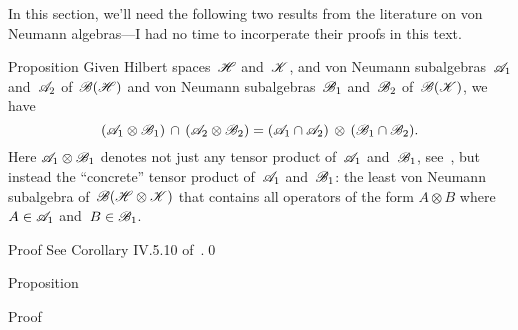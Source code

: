 \documentclass[a]{subfiles}
\begin{document}
\begin{parsec}%
\begin{point}%
In this section,
we'll need the following two results
from the literature on von Neumann algebras---I 
had no time to incorperate their proofs in this text.
\end{point}
\begin{point}{Proposition}%
Given Hilbert spaces~$\mathscr{H}$ and~$\mathscr{K}$,
and von Neumann subalgebras~$\mathscr{A}_1$ and~$\mathscr{A}_2$
of~$\mathscr{B}(\mathscr{H})$
and von Neumann subalgebras~$\mathscr{B}_1$ and~$\mathscr{B}_2$
of~$\mathscr{B}(\mathscr{K})$,
we have 
\begin{equation*}
(\mathscr{A}_1 \otimes  \mathscr{B}_1)\,\cap\,
(\mathscr{A}_2 \otimes \mathscr{B}_2)
= (\mathscr{A}_1\cap\mathscr{A}_2)\,\otimes\,
(\mathscr{B}_1\cap \mathscr{B}_2).
\end{equation*}
Here
$\mathscr{A}_1 \otimes \mathscr{B}_1$
denotes not just any tensor product of~$\mathscr{A}_1$ and~$\mathscr{B}_1$,
see~,
but instead
the ``concrete'' tensor product 
of~$\mathscr{A}_1$ and~$\mathscr{B}_1$:
the least von Neumann subalgebra of~$\mathscr{B}(\mathscr{H}\otimes\mathscr{K})$
that contains all operators
of the form $A\otimes B$ where~$A\in\mathscr{A}_1$
and~$B\in\mathscr{B}_1$.
\begin{point}{Proof}%
See Corollary IV.5.10 of~\cite{Takesaki1}.\qed
\end{point}
\end{point}
\begin{point}{Proposition}%
\begin{point}{Proof}%
\end{point}
\end{point}
\end{parsec}
\end{document}

